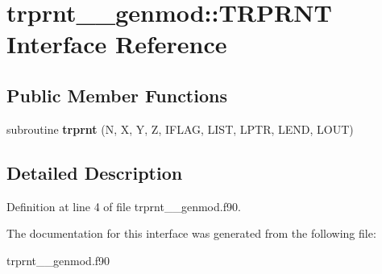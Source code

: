\hypertarget{interfacetrprnt____genmod_1_1_t_r_p_r_n_t}{\section{trprnt\+\_\+\+\_\+genmod\+:\+:T\+R\+P\+R\+N\+T Interface Reference}
\label{interfacetrprnt____genmod_1_1_t_r_p_r_n_t}
}
\subsection*{Public Member Functions}
\begin{DoxyCompactItemize}
\item 
\hypertarget{interfacetrprnt____genmod_1_1_t_r_p_r_n_t_a862f09ff49c2c0f18761fddb24a3f67b}{subroutine {\bfseries trprnt} (N, X, Y, Z, I\+F\+L\+A\+G, L\+I\+S\+T, L\+P\+T\+R, L\+E\+N\+D, L\+O\+U\+T)}\label{interfacetrprnt____genmod_1_1_t_r_p_r_n_t_a862f09ff49c2c0f18761fddb24a3f67b}

\end{DoxyCompactItemize}


\subsection{Detailed Description}


Definition at line 4 of file trprnt\+\_\+\+\_\+genmod.\+f90.



The documentation for this interface was generated from the following file\+:\begin{DoxyCompactItemize}
\item 
trprnt\+\_\+\+\_\+genmod.\+f90\end{DoxyCompactItemize}
